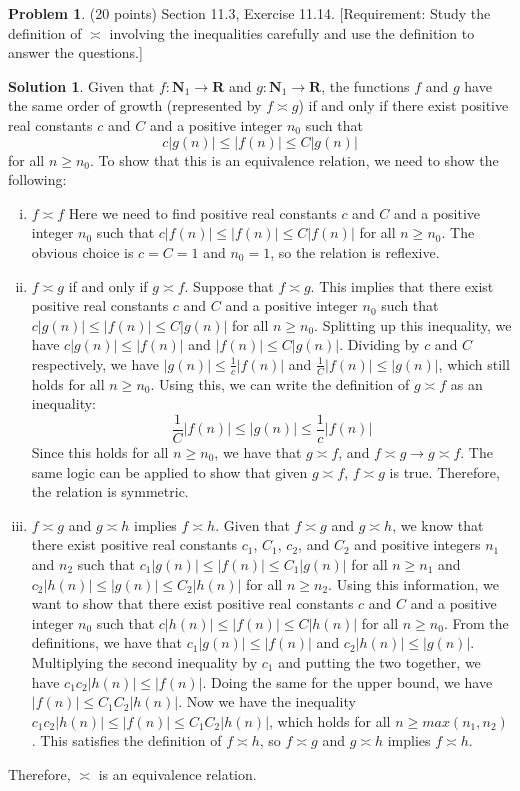 \documentclass{article}
\theoremstyle{definition}
\newtheorem{problem}{Problem}
\newtheorem*{solution}{Solution}
\newcommand{\N}{\mathbf{N}}
\newcommand{\R}{\mathbf{R}}
\begin{document}
\newpage
\begin{problem} (20 points) Section 11.3, Exercise 11.14.
[Requirement: Study the definition of $\asymp$ involving the inequalities carefully 
and use the definition to answer the questions.] 
\end{problem}
\begin{solution}
Given that $f: \N_1 \to \R$ and $g: \N_1 \to \R$,
the functions $f$ and $g$ have the same order of growth (represented by $f \asymp g$) 
if and only if there exist positive real constants $c$ and $C$ 
and a positive integer $n_0$ such that $$c|g(n)| \leq |f(n)| \leq C|g(n)|$$ for all $n \geq n_0$.
To show that this is an equivalence relation, we need to show the following:
\begin{enumerate}[(i)]
\item $f \asymp f$
\newline
Here we need to find positive real constants $c$ and $C$ and a positive integer $n_0$ 
such that $c|f(n)| \leq |f(n)| \leq C|f(n)|$ for all $n \geq n_0$.
The obvious choice is $c = C = 1$ and $n_0 = 1$, so the relation is reflexive.
\item $f \asymp g$ if and only if $g \asymp f$.
\newline
Suppose that $f \asymp g$.
This implies that there exist positive real constants $c$ and $C$ and a positive integer $n_0$
such that $c|g(n)| \leq |f(n)| \leq C|g(n)|$ for all $n \geq n_0$.
Splitting up this inequality, we have $c|g(n)| \leq |f(n)|$ and $|f(n)| \leq C|g(n)|$.
Dividing by $c$ and $C$ respectively, we have $|g(n)| \leq \frac{1}{c}|f(n)|$ and $\frac{1}{C}|f(n)| \leq |g(n)|$,
which still holds for all $n \geq n_0$.
Using this, we can write the definition of $g \asymp f$ as an inequality:
$$ \frac{1}{C}|f(n)| \leq |g(n)| \leq \frac{1}{c}|f(n)| $$
Since this holds for all $n \geq n_0$, we have that $g \asymp f$, and $f \asymp g \rightarrow g \asymp f$.
The same logic can be applied to show that given $g \asymp f$, $f \asymp g$ is true.
Therefore, the relation is symmetric.
\item $f \asymp g$ and $g \asymp h$ implies $f \asymp h$.
\newline
Given that $f \asymp g$ and $g \asymp h$, we know that there exist positive real constants $c_1$, $C_1$, $c_2$, and $C_2$
and positive integers $n_1$ and $n_2$ such that $c_1|g(n)| \leq |f(n)| \leq C_1|g(n)|$ for all $n \geq n_1$
and $c_2|h(n)| \leq |g(n)| \leq C_2|h(n)|$ for all $n \geq n_2$.
Using this information, we want to show that there exist positive real constants $c$ and $C$ and a positive integer $n_0$
such that $c|h(n)| \leq |f(n)| \leq C|h(n)|$ for all $n \geq n_0$.
From the definitions, we have that $c_1|g(n)| \leq |f(n)|$ and $c_2|h(n)| \leq |g(n)|$.
Multiplying the second inequality by $c_1$ and putting the two together, we have $c_1c_2|h(n)| \leq |f(n)|$.
Doing the same for the upper bound, we have $|f(n)| \leq C_1C_2|h(n)|$.
Now we have the inequality $c_1c_2|h(n)| \leq |f(n)| \leq C_1C_2|h(n)|$, which holds for all $n \geq max(n_1, n_2)$.
This satisfies the definition of $f \asymp h$, so $f \asymp g$ and $g \asymp h$ implies $f \asymp h$.
\end{enumerate}
Therefore, $\asymp$ is an equivalence relation.
\end{solution}
\end{document}
